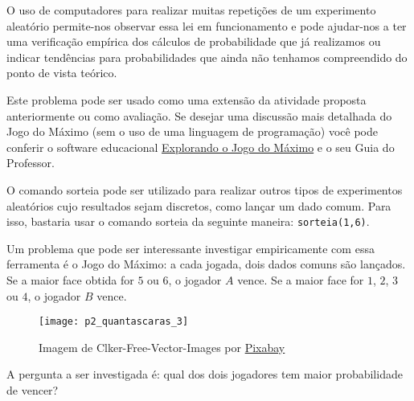 O uso de computadores para realizar muitas repetições de um experimento aleatório permite-nos observar essa lei em funcionamento e pode ajudar-nos a ter uma verificação empírica dos cálculos de probabilidade que já realizamos ou indicar tendências para probabilidades que ainda não tenhamos compreendido do ponto de vista teórico.

\label{comp-know5}

\begin{texto}
{
Este problema pode ser usado como uma extensão da atividade proposta anteriormente ou como avaliação. Se desejar uma discussão mais detalhada do Jogo do Máximo (sem o uso de uma linguagem de programação) você pode conferir o software educacional \href{https://m3.ime.unicamp.br/recursos/1237}{Explorando o Jogo do Máximo} e o seu Guia do Professor.	
}
\end{texto}

O comando sorteia pode ser utilizado para realizar outros tipos de experimentos aleatórios cujo resultados sejam discretos, como lançar um dado comum. Para isso, bastaria usar o comando sorteia da seguinte maneira: \verb|sorteia(1,6)|.

Um problema que pode ser interessante investigar empiricamente com essa ferramenta é o Jogo do Máximo: a cada jogada, dois dados comuns são lançados. Se a maior face obtida for $5$ ou $6$, o jogador $A$ vence. Se a maior face for $1$, $2$, $3$ ou $4$, o jogador $B$ vence.

\begin{figure}[H]
\centering

\texttt{[image: p2\_quantascaras\_3]}
\caption{Imagem de Clker-Free-Vector-Images por \href{https://pixabay.com/pt/?utm_source=link-attribution\&utm_medium=referral\&utm_campaign=image\&utm_content=25637}{Pixabay}}
\label{}
\end{figure}

A pergunta a ser investigada é: qual dos dois jogadores tem maior probabilidade de vencer?


